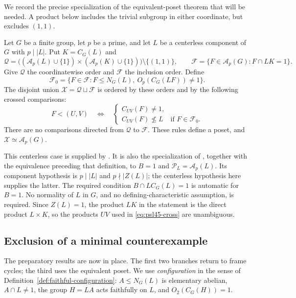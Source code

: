 We record the precise specialization of the equivalent-poset
theorem that will be needed. A product below includes the trivial
subgroup in either coordinate, but excludes $(1,1)$.

\begin{theorem}
\label{thm:psl45-equivalent-poset}
Let $G$ be a finite group, let $p$ be a prime, and let $L$ be a
centerless component of $G$ with $p\mid |L|$. Put $K=C_G(L)$ and
\[
 \mathcal Q=
 \bigl((\mathcal A_p(L)\cup\{1\})\times
             (\mathcal A_p(K)\cup\{1\})\bigr)\setminus\{(1,1)\},
 \qquad
 \mathcal F=\{F\in\mathcal A_p(G):F\cap LK=1\}.
\]
Give $\mathcal Q$ the coordinatewise order and $\mathcal F$ the
inclusion order. Define
\[
 \mathcal F_0=
 \{F\in\mathcal F:F\leq N_G(L),\
                         O_p(C_G(LF))\ne1\}.
\]
The disjoint union $\mathcal X=\mathcal Q\sqcup\mathcal F$ is
ordered by these orders and by the following crossed comparisons:
\begin{equation}\label{eq:psl45-cross}
 F<(U,V)
 \quad\Longleftrightarrow\quad
 \begin{cases}
 C_{UV}(F)\ne1,\\
 C_{UV}(F)\not\leq L&\text{if }F\in\mathcal F_0.
 \end{cases}
\end{equation}
There are no comparisons directed from $\mathcal Q$ to
$\mathcal F$. These rules define a poset, and
$\mathcal X\simeq\mathcal A_p(G)$.
\end{theorem}

This centerless case is supplied by
\citet[Propositions~4.11--4.12]{PitermanSmith2025}.
It is also the specialization of
\citet[Definition~3.2 and Theorem~3.3]{Piterman2026}, together with
the equivalence preceding that definition, to $B=1$ and
$\mathcal P_L=\mathcal A_p(L)$.
Its component hypothesis is $p\mid|L|$ and $p\nmid|Z(L)|$;
the centerless hypothesis here supplies the latter.
The required condition $B\cap LC_G(L)=1$ is automatic for $B=1$.
No normality of $L$ in $G$, and no defining-characteristic assumption,
is required. Since $Z(L)=1$, the product $LK$ in the statement is
the direct product $L\times K$, so the products $UV$ used in
\eqref{eq:psl45-cross} are unambiguous.

\subsection{Exclusion of a minimal counterexample}

The preparatory results are now in place. The first two branches
return to frame cycles; the third uses the equivalent poset. We use \emph{configuration} in the sense of
Definition~\ref{def:faithful-configuration}: $A\leq N_G(L)$ is elementary abelian,
$A\cap L\ne1$, the group $H=LA$ acts faithfully on $L$, and
$O_2(C_G(H))=1$.

